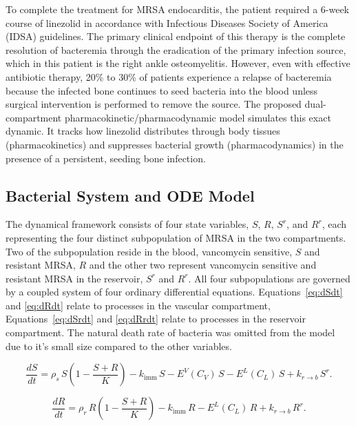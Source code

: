 \documentclass[utf8]{FrontiersinHarvard} %
\begin{document}
To complete the treatment for MRSA endocarditis, the patient required a 6-week course of linezolid in accordance with Infectious Diseases Society of America (IDSA) guidelines. The primary clinical endpoint of this therapy is the complete resolution of bacteremia through the eradication of the primary infection source, which in this patient is the right ankle osteomyelitis. However, even with effective antibiotic therapy, 20\% to 30\% of patients experience a relapse of bacteremia because the infected bone continues to seed bacteria into the blood unless surgical intervention is performed to remove the source. The proposed dual-compartment pharmacokinetic/pharmacodynamic model simulates this exact dynamic.  It tracks how linezolid distributes through body tissues (pharmacokinetics) and suppresses bacterial growth (pharmacodynamics) in the presence of a persistent, seeding bone infection.

\subsection{Bacterial System and ODE Model}
The dynamical framework consists of four state variables, $S$, $R$, $S^r$, and $R^r$, each representing the four distinct
subpopulation of MRSA in the two compartments.  Two of the subpopulation reside in the blood, vancomycin sensitive, $S$ and
resistant MRSA, $R$ and the other two represent vancomycin sensitive and resistant
MRSA in the reservoir, $S^r$ and $R^r$.  All four subpopulations are governed by a coupled system of four ordinary differential equations.
Equations~\eqref{eq:dSdt} and \eqref{eq:dRdt} relate to processes in the vascular compartment, Equations~\eqref{eq:dSrdt} and \eqref{eq:dRrdt}
relate to processes in the reservoir compartment.  The natural death rate of bacteria was omitted from the model due to it's small size
compared to the other variables.

\begin{equation}
\label{eq:dSdt}
\frac{dS}{dt}
= \rho_{s}\, S \left( 1 - \frac{S + R}{K} \right)
- k_{\text{imm}}\, S
- E^{V}(C_V)\, S
- E^{L}(C_L)\, S
+ k_{r\to b}\, S^r .
\end{equation}

\begin{equation}
\frac{dR}{dt}
= \rho_{r}\,R \left( 1 - \frac{S + R}{K} \right)
- k_{\text{imm}}\, R
- E^{L}(C_L)\, R
+ k_{r\to b}\, R^r .
\label{eq:dRdt}
\end{equation}
\end{document}
